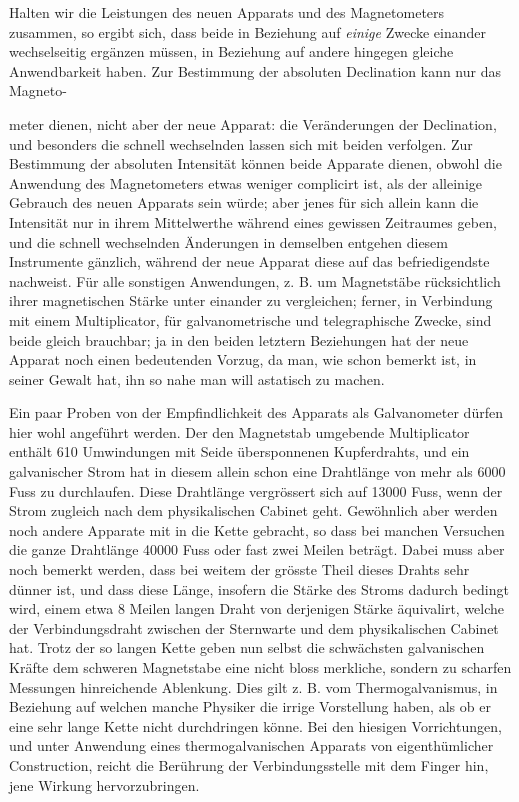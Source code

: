 Halten wir die Leistungen des neuen Apparats und des Magnetometers zusammen, so ergibt sich, dass beide in Beziehung auf \textit{einige} Zwecke einander wechselseitig ergänzen müssen, in Beziehung auf andere hingegen gleiche Anwendbarkeit haben. Zur Bestimmung der absoluten Declination kann nur das Magneto-
\par\clearpage
{}
\noindent meter dienen, nicht aber der neue Apparat: die Veränderungen der Declination, und besonders die schnell wechselnden lassen sich mit beiden verfolgen. Zur Bestimmung der absoluten Intensität können beide Apparate dienen, obwohl die Anwendung des Magnetometers etwas weniger complicirt ist, als der alleinige Gebrauch des neuen Apparats sein würde; aber jenes für sich allein kann die Intensität nur in ihrem Mittelwerthe während eines gewissen Zeitraumes geben, und die schnell wechselnden Änderungen in demselben entgehen diesem Instrumente gänzlich, während der neue Apparat diese auf das befriedigendste nachweist. Für alle sonstigen Anwendungen, z. B. um Magnetstäbe rücksichtlich ihrer magnetischen Stärke unter einander zu vergleichen; ferner, in Verbindung mit einem Multiplicator, für galvanometrische und telegraphische Zwecke, sind beide gleich brauchbar; ja in den beiden letztern Beziehungen hat der neue Apparat noch einen bedeutenden Vorzug, da man, wie schon bemerkt ist, in seiner Gewalt hat, ihn so nahe man will astatisch zu machen.

Ein paar Proben von der Empfindlichkeit des Apparats als Galvanometer dürfen hier wohl angeführt werden. Der den Magnetstab umgebende Multiplicator enthält 610 Umwindungen mit Seide übersponnenen Kupferdrahts, und ein galvanischer Strom hat in diesem allein schon eine Drahtlänge von mehr als 6000 Fuss zu durchlaufen. Diese Drahtlänge vergrössert sich auf 13000 Fuss, wenn der Strom zugleich nach dem physikalischen Cabinet geht. Gewöhnlich aber werden noch andere Apparate mit in die Kette gebracht, so dass bei manchen Versuchen die ganze Drahtlänge 40000 Fuss oder fast zwei Meilen beträgt. Dabei muss aber noch bemerkt werden, dass bei weitem der grösste Theil dieses Drahts sehr dünner ist, und dass diese Länge, insofern die Stärke des Stroms dadurch bedingt wird, einem etwa 8 Meilen langen Draht von derjenigen Stärke äquivalirt, welche der Verbindungsdraht zwischen der Sternwarte und dem physikalischen Cabinet hat. Trotz der so langen Kette geben nun selbst die schwächsten galvanischen Kräfte dem schweren Magnetstabe eine nicht bloss merkliche, sondern zu scharfen Messungen hinreichende Ablenkung. Dies gilt z. B. vom Thermogalvanismus, in Beziehung auf welchen manche Physiker die irrige Vorstellung haben, als ob er eine sehr lange Kette nicht durchdringen könne. Bei den hiesigen Vorrichtungen, und unter Anwendung eines thermogalvanischen Apparats von eigenthümlicher Construction, reicht die Berührung der Verbindungsstelle mit dem Finger hin, jene Wirkung hervorzubringen.

